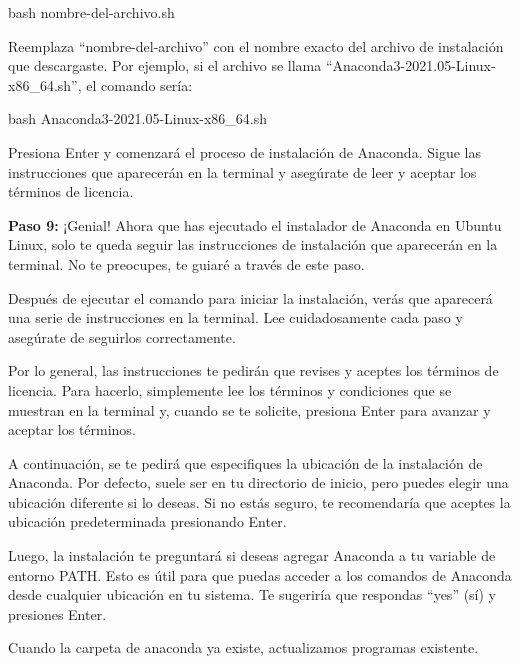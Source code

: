 \documentclass[
  jou,
  floatsintext,
  longtable,
  a4paper,
  nolmodern,
  notxfonts,
  notimes,
  colorlinks=true,linkcolor=blue,citecolor=blue,urlcolor=blue]{apa7}
\newenvironment{Shaded}{\begin{snugshade}}{\end{snugshade}}
\newcommand{\FunctionTok}[1]{\textcolor[rgb]{0.28,0.35,0.67}{#1}}
\newcommand{\NormalTok}[1]{\textcolor[rgb]{0.00,0.23,0.31}{#1}}
\begin{document}
\begin{Shaded}
\begin{Highlighting}[]
\FunctionTok{bash}\NormalTok{ nombre{-}del{-}archivo.sh}
\end{Highlighting}
\end{Shaded}

Reemplaza ``nombre-del-archivo'' con el nombre exacto del archivo de
instalación que descargaste. Por ejemplo, si el archivo se llama
``Anaconda3-2021.05-Linux-x86\_64.sh'', el comando sería:

\begin{Shaded}
\begin{Highlighting}[]
\FunctionTok{bash}\NormalTok{ Anaconda3{-}2021.05{-}Linux{-}x86\_64.sh}
\end{Highlighting}
\end{Shaded}

Presiona Enter y comenzará el proceso de instalación de Anaconda. Sigue
las instrucciones que aparecerán en la terminal y asegúrate de leer y
aceptar los términos de licencia.

\textbf{Paso 9:} ¡Genial! Ahora que has ejecutado el instalador de
Anaconda en Ubuntu Linux, solo te queda seguir las instrucciones de
instalación que aparecerán en la terminal. No te preocupes, te guiaré a
través de este paso.

Después de ejecutar el comando para iniciar la instalación, verás que
aparecerá una serie de instrucciones en la terminal. Lee cuidadosamente
cada paso y asegúrate de seguirlos correctamente.

Por lo general, las instrucciones te pedirán que revises y aceptes los
términos de licencia. Para hacerlo, simplemente lee los términos y
condiciones que se muestran en la terminal y, cuando se te solicite,
presiona Enter para avanzar y aceptar los términos.

A continuación, se te pedirá que especifiques la ubicación de la
instalación de Anaconda. Por defecto, suele ser en tu directorio de
inicio, pero puedes elegir una ubicación diferente si lo deseas. Si no
estás seguro, te recomendaría que aceptes la ubicación predeterminada
presionando Enter.

Luego, la instalación te preguntará si deseas agregar Anaconda a tu
variable de entorno PATH. Esto es útil para que puedas acceder a los
comandos de Anaconda desde cualquier ubicación en tu sistema. Te
sugeriría que respondas ``yes'' (sí) y presiones Enter.

Cuando la carpeta de anaconda ya existe, actualizamos programas
existente.
\end{document}
